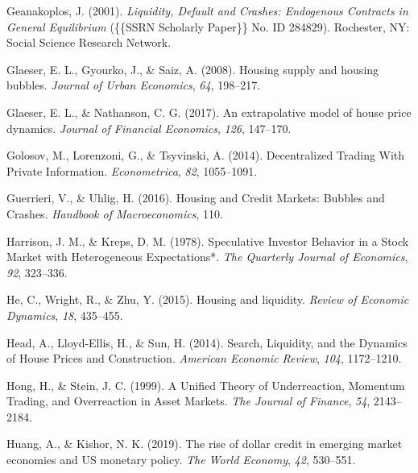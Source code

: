 \documentclass[
  12pt,
]{article}
\newlength{\cslhangindent}
\newlength{\cslentryspacingunit} %
\newenvironment{CSLReferences}[2] %
 {%
  \setlength{\parindent}{0pt}
  \ifodd #1
  \let\oldpar\par
  \def\par{\hangindent=\cslhangindent\oldpar}
  \fi
  \setlength{\parskip}{#2\cslentryspacingunit}
 }%
 {}
\begin{document}
\begin{CSLReferences}{1}{0}
\leavevmode{}%
Geanakoplos, J. (2001). \emph{Liquidity, {Default} and {Crashes}: {Endogenous Contracts} in {General Equilibrium}} (\{\{SSRN Scholarly Paper\}\} No. ID 284829). {Rochester, NY}: {Social Science Research Network}.

\leavevmode{}%
Glaeser, E. L., Gyourko, J., \& Saiz, A. (2008). Housing supply and housing bubbles. \emph{Journal of Urban Economics}, \emph{64}, 198--217.

\leavevmode{}%
Glaeser, E. L., \& Nathanson, C. G. (2017). An extrapolative model of house price dynamics. \emph{Journal of Financial Economics}, \emph{126}, 147--170.

\leavevmode{}%
Golosov, M., Lorenzoni, G., \& Tsyvinski, A. (2014). Decentralized {Trading With Private Information}. \emph{Econometrica}, \emph{82}, 1055--1091.

\leavevmode{}%
Guerrieri, V., \& Uhlig, H. (2016). Housing and {Credit Markets}: {Bubbles} and {Crashes}. \emph{Handbook of Macroeconomics}, 110.

\leavevmode{}%
Harrison, J. M., \& Kreps, D. M. (1978). Speculative {Investor Behavior} in a {Stock Market} with {Heterogeneous Expectations}*. \emph{The Quarterly Journal of Economics}, \emph{92}, 323--336.

\leavevmode{}%
He, C., Wright, R., \& Zhu, Y. (2015). Housing and liquidity. \emph{Review of Economic Dynamics}, \emph{18}, 435--455.

\leavevmode{}%
Head, A., Lloyd-Ellis, H., \& Sun, H. (2014). Search, {Liquidity}, and the {Dynamics} of {House Prices} and {Construction}. \emph{American Economic Review}, \emph{104}, 1172--1210.

\leavevmode{}%
Hong, H., \& Stein, J. C. (1999). A {Unified Theory} of {Underreaction}, {Momentum Trading}, and {Overreaction} in {Asset Markets}. \emph{The Journal of Finance}, \emph{54}, 2143--2184.

\leavevmode{}%
Huang, A., \& Kishor, N. K. (2019). The rise of dollar credit in emerging market economies and {US} monetary policy. \emph{The World Economy}, \emph{42}, 530--551.


\end{CSLReferences}
\end{document}
